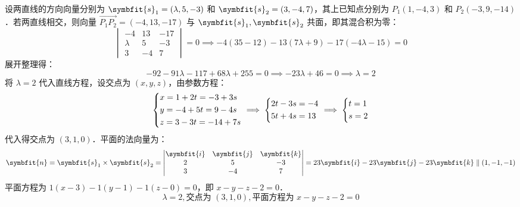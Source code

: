 \begin{solution}
    设两直线的方向向量分别为 $\symbfit{s}_1 = (\lambda, 5, -3)$ 和 $\symbfit{s}_2 = (3, -4, 7)$，其上已知点分别为 $P_1(1, -4, 3)$ 和 $P_2(-3,\allowbreak 9,\allowbreak -14)$．若两直线相交，则向量 $\overrightarrow{P_1P_2} = (-4, 13, -17)$ 与 $\symbfit{s}_1, \symbfit{s}_2$ 共面，即其混合积为零：
    \begin{equation}
        \begin{vmatrix} -4 & 13 & -17 \\ \lambda & 5 & -3 \\ 3 & -4 & 7 \end{vmatrix} = 0 \implies -4(35 - 12) - 13(7\lambda + 9) - 17(-4\lambda - 15) = 0
    \end{equation}
    展开整理得：
    \begin{equation}
        -92 - 91\lambda - 117 + 68\lambda + 255 = 0 \implies -23\lambda + 46 = 0 \implies \lambda = 2
    \end{equation}
    将 $\lambda = 2$ 代入直线方程，设交点为 $(x, y, z)$，由参数方程：
    \begin{equation}
        \begin{dcases} x = 1 + 2t = -3 + 3s \\ y = -4 + 5t = 9 - 4s \\ z = 3 - 3t = -14 + 7s \end{dcases} \implies \begin{dcases} 2t - 3s = -4 \\ 5t + 4s = 13 \end{dcases} \implies \begin{dcases} t = 1 \\ s = 2 \end{dcases}
    \end{equation}
    代入得交点为 $(3, 1, 0)$．平面的法向量为：
    \begin{equation}
        \symbfit{n} = \symbfit{s}_1 \times \symbfit{s}_2 = \begin{vmatrix} \symbfit{i} & \symbfit{j} & \symbfit{k} \\ 2 & 5 & -3 \\ 3 & -4 & 7 \end{vmatrix} = 23\symbfit{i} - 23\symbfit{j} - 23\symbfit{k} \parallel (1, -1, -1)
    \end{equation}
    平面方程为 $1(x - 3) - 1(y - 1) - 1(z - 0) = 0$，即 $x - y - z - 2 = 0$．
    \begin{equation}
        \boxed{\lambda = 2, \text{交点为 } (3, 1, 0), \text{平面方程为 } x - y - z - 2 = 0}
    \end{equation}
\end{solution}


